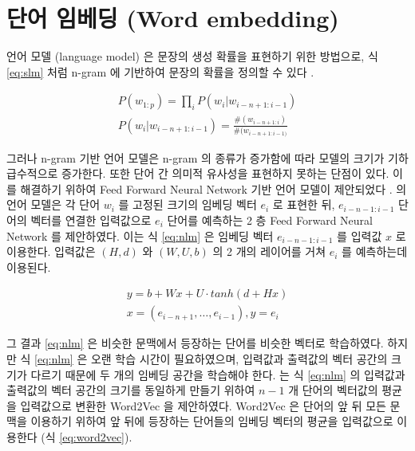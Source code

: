 \documentclass[oneside, ko,phd]{snuthesis_utf8_kor}
\begin{document}
\section{단어 임베딩 (Word embedding)}

언어 모델 (language model) 은 문장의 생성 확률을 표현하기 위한 방법으로, 식 \ref{eq:slm} 처럼 n-gram 에 기반하여 문장의 확률을 정의할 수 있다 \cite{jurafsky2014speech}.

\begin{equation}
  \label{eq:slm}
  \begin{aligned}
  P(w_{1:p}) = \prod_i P(w_i \vert w_{i-n+1:i-1}) \\
  P(w_i \vert w_{i-n+1:i-1}) = \frac{\#(w_{i-n+1:i})}{\#(w_{i-n+1:i-1)}}
  \end{aligned}
\end{equation}

그러나 n-gram 기반 언어 모델은 n-gram 의 종류가 증가함에 따라 모델의 크기가 기하급수적으로 증가한다.
또한 단어 간 의미적 유사성을 표현하지 못하는 단점이 있다.
이를 해결하기 위하여 Feed Forward Neural Network 기반 언어 모델이 제안되었다 \cite{bengio2003neural}.
\cite{bengio2003neural} 의 언어 모델은 각 단어 $w_i$ 를 고정된 크기의 임베딩 벡터 $e_i$ 로 표현한 뒤, $e_{i-n-1:i-1}$ 단어의 벡터를 연결한 입력값으로 $e_i$ 단어를 예측하는 2 층 Feed Forward Neural Network 를 제안하였다.
이는 식 \ref{eq:nlm} 은 임베딩 벡터 $e_{i-n-1:i-1}$ 를 입력값 $x$ 로 이용한다.
입력값은 $(H, d)$ 와 $(W, U, b)$ 의 2 개의 레이어를 거쳐 $e_i$ 를 예측하는데 이용된다.

\begin{equation}
  \label{eq:nlm}
  \begin{aligned}
  y = b + Wx + U \cdot tanh(d + Hx) \\
  x = (e_{i-n+1}, \dots, e_{i-1}), y = e_i
  \end{aligned}
\end{equation}

그 결과 \ref{eq:nlm} 은 비슷한 문맥에서 등장하는 단어를 비슷한 벡터로 학습하였다.
하지만 식 \ref{eq:nlm} 은 오랜 학습 시간이 필요하였으며, 입력값과 출력값의 벡터 공간의 크기가 다르기 때문에 두 개의 임베딩 공간을 학습해야 한다.
\cite{mikolov2013efficient} 는 식 \ref{eq:nlm} 의 입력값과 출력값의 벡터 공간의 크기를 동일하게 만들기 위하여 $n-1$ 개 단어의 벡터값의 평균을 입력값으로 변환한 Word2Vec 을 제안하였다.
Word2Vec 은 단어의 앞 뒤 모든 문맥을 이용하기 위하여 앞 뒤에 등장하는 단어들의 임베딩 벡터의 평균을 입력값으로 이용한다 (식 \ref{eq:word2vec}).
\end{document}
